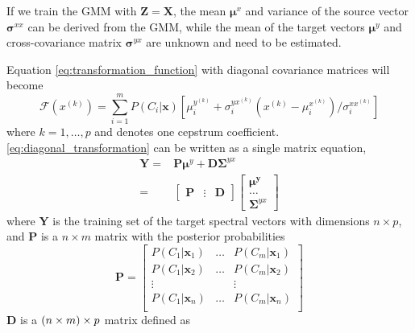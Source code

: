 If we train the GMM with $\mathbf{Z}=\mathbf{X}$, the mean $\boldsymbol{\mu}^x$ and variance of the source vector $\boldsymbol{\sigma}^{xx}$ can be derived from the GMM, while the mean of the target vectors $\boldsymbol{\mu}^y$ and cross-covariance matrix $\mathbf{\sigma}^{yx}$ are unknown and need to be estimated. 

Equation \eqref{eq:transformation_function} with diagonal covariance matrices will become
\begin{equation}
	\label{eq:diagonal_transformation}
	\mathcal{F}(x^{(k)}) = \sum_{i=1}^{m} P(C_i\vert \mathbf{x}) [\mu_i^{y^{(k)}}+\sigma_i^{yx^{(k)}}  (x^{(k)}-\mu_i^{x^{(k)}})/\sigma_i^{xx^{(k)}}]
\end{equation}
where $k=1,\dots,p$ and denotes one cepstrum coefficient. \eqref{eq:diagonal_transformation} can be written as a single matrix equation,
\begin{equation}
	\label{eq:least_square_problem}
	\begin{split}
		\mathbf{Y} = &\mathbf{P}\boldsymbol{\mu}^y + \mathbf{D}\mathbf{\Sigma}^{yx} \\
		= & \begin{bmatrix}
			\mathbf{P}& \vdots &\mathbf{D}
		\end{bmatrix}
		\begin{bmatrix}
			\boldsymbol{\mu^y} \\
			\dots \\
			\mathbf{\Sigma}^{yx}
		\end{bmatrix}
	\end{split}
\end{equation}
where $\mathbf{Y}$ is the training set of the target spectral vectors with dimensions $n\times p$, and $\mathbf{P}$ is a $n \times m$ matrix with the posterior probabilities
\begin{equation}
	\label{eq:P_matrix}
	\mathbf{P} = \begin{bmatrix}
		P(C_1\vert \mathbf{x}_1) & \dots & P(C_m\vert \mathbf{x}_1) \\
		P(C_1\vert \mathbf{x}_2) & \dots & P(C_m\vert \mathbf{x}_2) \\
		\vdots & & \vdots \\
		P(C_1\vert \mathbf{x}_n) & \dots & P(C_m\vert \mathbf{x}_n) \\
	\end{bmatrix}
\end{equation}
$\mathbf{D}$ is a $\left(n \times m\right)\times p$ matrix defined as

